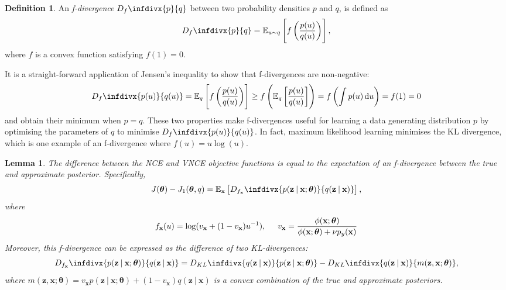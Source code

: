 \documentclass[11pt, oneside]{article}
\newcommand{\thetab}{{\boldsymbol{\theta}}}
\newcommand{\pnn}{\phi}
\newcommand{\x}{{\mathbf x}}
\newcommand{\z}{{\mathbf z}}
\newcommand{\E}{\mathbb{E}}
\newcommand{\Ex}{\E_{\x}}
\newcommand\given[1][]{\:#1\vert\:}
\newcommand{\infdiv}[1]{D_{#1}\infdivx}
\newtheorem{lemma}[theorem]{Lemma}
\theoremstyle{definition}
\newtheorem{definition}{Definition}[section]
\begin{document}
\theoremstyle{definition}
\begin{definition}
An \emph{f-divergence} $\infdiv{f}{p}{q}$ between two probability densities $p$ and $q$, is defined as
\begin{equation}
    \infdiv{f}{p}{q} = \mathbb{E}_{u \sim q} \left[ f\left(\frac{p(u)}{q(u)}\right) \right],
\end{equation}
where $f$ is a convex function satisfying $f(1) = 0$.
\end{definition}
It is a straight-forward application of Jensen's inequality to show that f-divergences are non-negative:
\begin{equation}
    \infdiv{f}{p(u)}{q(u)} = \mathbb{E}_q \left[ f\left( \frac{p(u)}{q(u)} \right) \right] \geq f\left( \mathbb{E}_q \left[  \frac{p(u)}{q(u)} \right]  \right) = f \left( \int p(u) \dif u \right) = f(1) = 0
\end{equation}
and obtain their minimum when $p = q$. These two properties make f-divergences useful for learning a data generating distribution $p$ by optimising the parameters of $q$ to minimise $\infdiv{f}{p(u)}{q(u)}$. In fact, maximum likelihood learning minimises the KL divergence, which is one example of an f-divergence where $f(u) = u \log(u)$.
\begin{lemma}
\label{lemma: diff J - J1}
    The difference between the NCE and VNCE objective functions is equal to the expectation of an f-divergence between the true and approximate posterior. Specifically,
    \begin{equation}
        J(\thetab) - J_1(\thetab, q) = \Ex \left[ \infdiv{f_{\x}}{p(\z \given \x; \thetab)}{q(\z \given \x)} \right],
    \end{equation}
where
\begin{equation}
    f_{\x}(u) = \log(v_{\x} + (1 - v_{\x})u^{-1}), \hspace{5mm} v_{\x} = \frac{\pnn(\x; \thetab)}{\pnn(\x; \thetab) + \nu p_{y}(\x)}
\end{equation}
Moreover, this f-divergence can be expressed as the difference of two KL-divergences:
\begin{equation}
\label{eq: f-divergence is diff of two KLs}
     \infdiv{f_{\x}}{p(\z \given \x; \thetab)}{q(\z \given \x)} = \infdiv{KL}{q(\z \given \x)}{p(\z \given \x; \thetab)} - \infdiv{KL}{q(\z \given \x)}{m(\z, \x ; \thetab)},
\end{equation}
where $m(\z, \x ; \thetab) = v_{\x}p(\z \given \x; \thetab) + (1 - v_{\x})q(\z \given \x)$ is a convex combination of the true and approximate posteriors.
\end{lemma}
\end{document}
